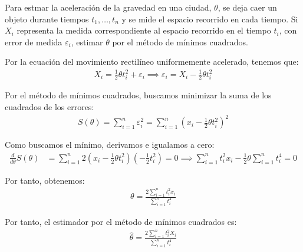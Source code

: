 \begin{ejemplo}
    Para estmar la aceleración de la gravedad en una ciudad, $\theta$, se deja caer un objeto durante tiempos $t_1, \ldots, t_n$ y se mide el espacio recorrido en cada tiempo. Si $X_i$ representa la medida correspondiente al espacio recorrido en el tiempo $t_i$, con error de medida $\varepsilon_i$, estimar $\theta$ por el método de mínimos cuadrados.
    
    Por la ecuación del movimiento rectilíneo uniformemente acelerado, tenemos que:
    \begin{align*}
        X_i = \frac{1}{2}\theta t_i^2 + \varepsilon_i \implies \varepsilon_i = X_i - \frac{1}{2}\theta t_i^2
    \end{align*}

    Por el método de mínimos cuadrados, buscamos minimizar la suma de los cuadrados de los errores:
    \begin{align*}
        S(\theta) = \sum_{i=1}^{n} \varepsilon_i^2 = \sum_{i=1}^{n} \left(x_i - \frac{1}{2}\theta t_i^2\right)^2
    \end{align*}

    Como buscamos el mínimo, derivamos e igualamos a cero:
    \begin{align*}
        \frac{d}{d\theta} S(\theta) &= \sum_{i=1}^{n} 2\left(x_i - \frac{1}{2}\theta t_i^2\right)\left(-\frac{1}{2}t_i^2\right) = 0 \implies \sum_{i=1}^{n} t_i^2 x_i - \frac{1}{2}\theta \sum_{i=1}^{n} t_i^4 = 0
    \end{align*}

    Por tanto, obtenemos:
    \begin{align*}
        \theta = \frac{2\sum\limits_{i=1}^{n} t_i^2 x_i}{\sum\limits_{i=1}^{n} t_i^4}
    \end{align*}

    Por tanto, el estimador por el método de mínimos cuadrados es:
    \begin{align*}
        \hat{\theta} = \frac{2\sum\limits_{i=1}^{n} t_i^2 X_i}{\sum\limits_{i=1}^{n} t_i^4}
    \end{align*}


\end{ejemplo}